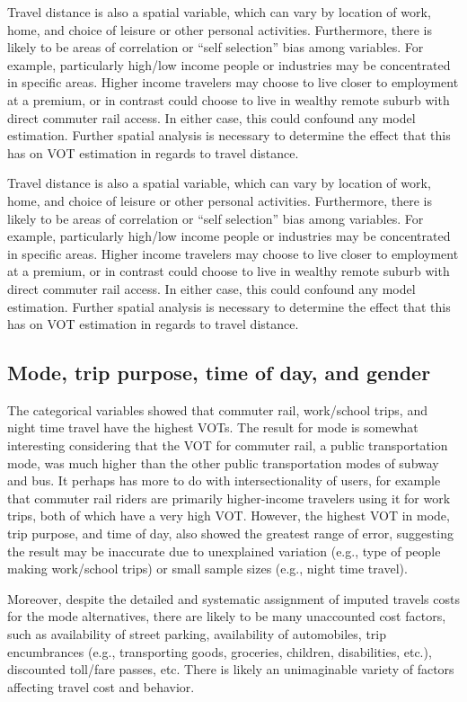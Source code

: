 \documentclass[numbered]{trbunofficial}\usepackage[]{graphicx}\usepackage[]{color}
\begin{document}
Travel distance is also a spatial variable, which can vary by location of work, home, and choice of leisure or other personal activities. Furthermore, there is likely to be areas of correlation or ``self selection'' bias among variables. For example, particularly high/low income people or industries may be concentrated in specific areas. Higher income travelers may choose to live closer to employment at a premium, or in contrast could choose to live in wealthy remote suburb with direct commuter rail access. In either case, this could confound any model estimation. Further spatial analysis is necessary to determine the effect that this has on VOT estimation in regards to travel distance.

Travel distance is also a spatial variable, which can vary by location of work, home, and choice of leisure or other personal activities. Furthermore, there is likely to be areas of correlation or ``self selection'' bias among variables. For example, particularly high/low income people or industries may be concentrated in specific areas. Higher income travelers may choose to live closer to employment at a premium, or in contrast could choose to live in wealthy remote suburb with direct commuter rail access. In either case, this could confound any model estimation. Further spatial analysis is necessary to determine the effect that this has on VOT estimation in regards to travel distance.

\subsection{Mode, trip purpose, time of day, and gender}
The categorical variables showed that commuter rail, work/school trips, and night time travel have the highest VOTs. The result for mode is somewhat interesting considering that the VOT for commuter rail, a public transportation mode, was much higher than the other public transportation modes of subway and bus. It perhaps has more to do with intersectionality of users, for example that commuter rail riders are primarily higher-income travelers using it for work trips, both of which have a very high VOT. However, the highest VOT in mode, trip purpose, and time of day, also showed the greatest range of error, suggesting the result may be inaccurate due to unexplained variation (e.g., type of people making work/school trips) or small sample sizes (e.g., night time travel).

Moreover, despite the detailed and systematic assignment of imputed travels costs for the mode alternatives, there are likely to be many unaccounted cost factors, such as availability of street parking, availability of automobiles, trip encumbrances (e.g., transporting goods, groceries, children, disabilities, etc.), discounted toll/fare passes, etc. There is likely an unimaginable variety of factors affecting travel cost and behavior. 
\end{document}

